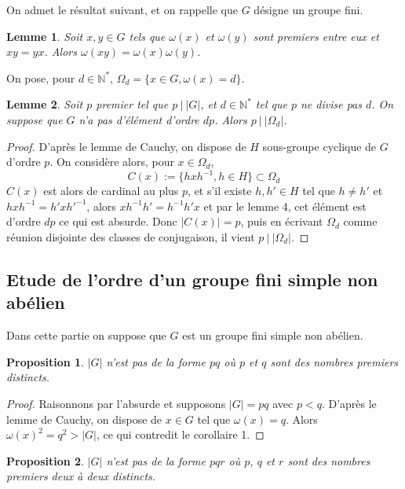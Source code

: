 \documentclass[10pt,a4paper]{article}
\newtheorem{lemma}{Lemme}
\newtheorem{prop}{Proposition}
\begin{document}
On admet le résultat suivant, et on rappelle que $G$ désigne un groupe fini.

\begin{lemma}
    Soit $x,y \in G$ tels que $\omega(x)$ et $\omega(y)$ sont premiers entre eux et $xy=yx$. Alors $\omega(xy) = \omega(x)\omega(y)$.
\end{lemma}

On pose, pour $d \in \mathbb{N}^*$, $\Omega_{d} = \{x \in G, \omega(x) = d \}$.

\begin{lemma}
    Soit $p$ premier tel que $p \: | \: |G|$, et $d \in \mathbb{N}^*$ tel que $p$ ne divise pas $d$. On suppose que $G$ n'a pas d'élément d'ordre $dp$. Alors $p \: | \: |\Omega_{d}|$.
\end{lemma}

\begin{proof}
    D'après le lemme de Cauchy, on dispose de $H$ sous-groupe cyclique de $G$ d'ordre $p$. On considère alors, pour $x \in \Omega_{d}$,
    $$C(x):= \{hxh^{-1}, h \in H \} \subset \Omega_{d}$$
    $C(x)$ est alors de cardinal au plus $p$, et s'il existe $h,h' \in H$ tel que $h \neq h'$ et $hxh^{-1}=h'xh'^{-1}$, alors $xh^{-1}h'=h^{-1}h'x$ et par le lemme 4, cet élément est d'ordre $dp$ ce qui est absurde. Donc $|C(x)|=p$, puis en écrivant $\Omega_d$ comme réunion disjointe des classes de conjugaison, il vient $p \: | \: |\Omega_d|$.

\end{proof}


\subsection{Etude de l'ordre d'un groupe fini simple non abélien}

Dans cette partie on suppose que $G$ est un groupe fini simple non abélien.

\begin{prop}
    $|G|$ n'est pas de la forme $pq$ où $p$ et $q$ sont des nombres premiers distincts.
\end{prop}

\begin{proof}
    Raisonnons par l'absurde et supposons $|G| = pq$ avec $ p < q$. D'après le lemme de Cauchy, on dispose de $x \in G$ tel que $\omega(x)=q$. Alors $\omega(x)^2=q^2 > |G|$, ce qui contredit le corollaire 1.
\end{proof}

\begin{prop}
    $|G|$ n'est pas de la forme $pqr$ où $p$, $q$ et $r$ sont des nombres premiers deux à deux distincts.
\end{prop}
\end{document}
